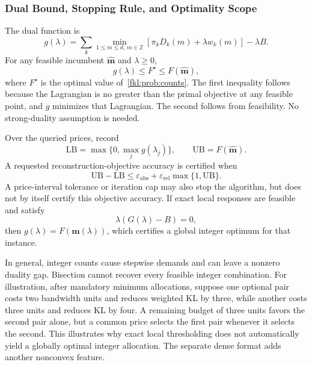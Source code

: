 \subsubsection{Dual Bound, Stopping Rule, and Optimality Scope}
The dual function is
\begin{equation}
 g(\lambda)=\sum_k\min_{1\le m\le d,\,m\in\mathbb Z}
 \left[\pi_kD_k(m)+\lambda w_k(m)\right]-\lambda B.
 \label{fkl:eq:dual}
\end{equation}
For any feasible incumbent $\widehat{\mathbf m}$ and $\lambda\ge0$,
\begin{equation}
 g(\lambda)\le F^\star\le F(\widehat{\mathbf m}),
 \label{fkl:eq:gap-bound}
\end{equation}
where $F^\star$ is the optimal value of~\eqref{fkl:prob:counts}. The first inequality follows because the Lagrangian is no greater than the primal objective at any feasible point, and $g$ minimizes that Lagrangian. The second follows from feasibility. No strong-duality assumption is needed.

Over the queried prices, record
\begin{equation}
 \mathrm{LB}=\max\{0,\max_jg(\lambda_j)\},\qquad
 \mathrm{UB}=F(\widehat{\mathbf m}).
 \label{fkl:eq:bounds}
\end{equation}
A requested reconstruction-objective accuracy is certified when
\begin{equation}
 \mathrm{UB}-\mathrm{LB}
 \le\varepsilon_{\mathrm{abs}}+
 \varepsilon_{\mathrm{rel}}\max\{1,\mathrm{UB}\}.
 \label{fkl:eq:gap-stop}
\end{equation}
A price-interval tolerance or iteration cap may also stop the algorithm, but does not by itself certify this objective accuracy. If exact local responses are feasible and satisfy
\begin{equation}
 \lambda\left(G(\lambda)-B\right)=0,
 \label{fkl:eq:complementarity}
\end{equation}
then $g(\lambda)=F(\mathbf m(\lambda))$, which certifies a global integer optimum for that instance.

In general, integer counts cause stepwise demands and can leave a nonzero duality gap. Bisection cannot recover every feasible integer combination. For illustration, after mandatory minimum allocations, suppose one optional pair costs two bandwidth units and reduces weighted KL by three, while another costs three units and reduces KL by four. A remaining budget of three units favors the second pair alone, but a common price selects the first pair whenever it selects the second. This illustrates why exact local thresholding does not automatically yield a globally optimal integer allocation. The separate dense format adds another nonconvex feature.

